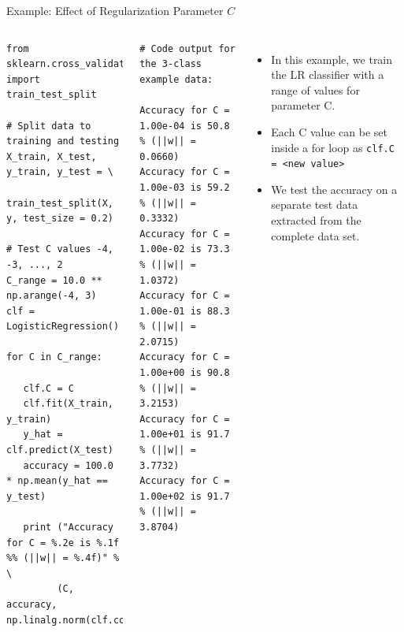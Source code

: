 \documentclass[10pt, aspectratio=169]{beamer} %
\begin{document}
\begin{frame}[fragile]{Example: Effect of Regularization Parameter $C$}
\begin{columns}
\begin{lstlisting}
from sklearn.cross_validation import train_test_split

# Split data to training and testing
X_train, X_test, y_train, y_test = \
      train_test_split(X, y, test_size = 0.2)

# Test C values -4, -3, ..., 2
C_range = 10.0 ** np.arange(-4, 3)
clf = LogisticRegression()

for C in C_range:

   clf.C = C
   clf.fit(X_train, y_train)
   y_hat = clf.predict(X_test)
   accuracy = 100.0 * np.mean(y_hat == y_test)

   print ("Accuracy for C = %.2e is %.1f %% (||w|| = %.4f)" % \
         (C, accuracy, np.linalg.norm(clf.coef_)))
\end{lstlisting}
\begin{lstlisting}
# Code output for the 3-class example data:

Accuracy for C = 1.00e-04 is 50.8 % (||w|| = 0.0660)
Accuracy for C = 1.00e-03 is 59.2 % (||w|| = 0.3332)
Accuracy for C = 1.00e-02 is 73.3 % (||w|| = 1.0372)
Accuracy for C = 1.00e-01 is 88.3 % (||w|| = 2.0715)
Accuracy for C = 1.00e+00 is 90.8 % (||w|| = 3.2153)
Accuracy for C = 1.00e+01 is 91.7 % (||w|| = 3.7732)
Accuracy for C = 1.00e+02 is 91.7 % (||w|| = 3.8704)
\end{lstlisting}
\begin{itemize}
	\item In this example, we train the LR classifier with a range of values for parameter C.
	\item Each C value can be set inside a for loop as \mbox{\texttt{clf.C = <new value>}}
	\item We test the accuracy on a separate test data extracted from the complete data set.
\end{itemize}
\end{columns}
\end{frame}
\end{document}
